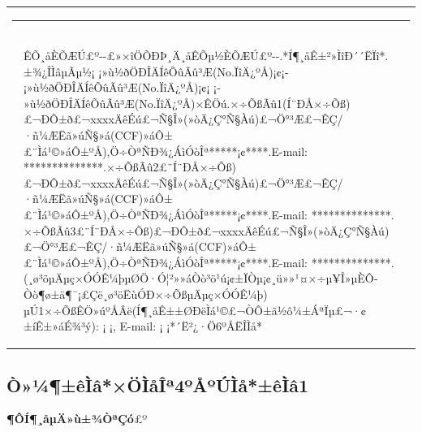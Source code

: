 \documentclass[10.5pt,compsoc]{CjC}
\theoremstyle{mystyle}
\begin{document}
\begin{table}[!t]
\setlength{\tabcolsep}{2pt}
\begin{tabular}{p{0.05cm}p{16.15cm}}
\multicolumn{2}{l}{\rule[4mm]{40mm}{0.1mm}}\\[-3mm]
&\begin{CJK*}{GBK}{gbsn}
ÊÕ¸åÈÕÆÚ£º\quad \quad -\quad -\quad £»×îÖÕÐÞ¸Ä¸åÊÕµ½ÈÕÆÚ£º\quad \quad -\quad -\quad .*Í¶¸åÊ±²»ÌîÐ´´ËÏî*. ±¾¿ÎÌâµÃµ½¡­ ¡­»ù½ðÖÐÎÄÍêÕûÃû³Æ(No.ÏîÄ¿ºÅ)¡¢¡­ ¡­»ù½ðÖÐÎÄÍêÕûÃû³Æ(No.ÏîÄ¿ºÅ)¡¢¡­ ¡­ »ù½ðÖÐÎÄÍêÕûÃû³Æ(No.ÏîÄ¿ºÅ)×ÊÖú.×÷ÕßÃû1(Í¨ÐÅ×÷Õß)£¬ÐÔ±ð£¬xxxxÄêÉú£¬Ñ§Î»(»òÄ¿Ç°Ñ§Àú)£¬Ö°³Æ£¬ÊÇ/·ñ¼ÆËã»úÑ§»á(CCF)»áÔ±£¨Ìá¹©»áÔ±ºÅ),Ö÷ÒªÑÐ¾¿ÁìÓòÎª*****¡¢****.E-mail: **************.×÷ÕßÃû2£¨Í¨ÐÅ×÷Õß)£¬ÐÔ±ð£¬xxxxÄêÉú£¬Ñ§Î»(»òÄ¿Ç°Ñ§Àú)£¬Ö°³Æ£¬ÊÇ/·ñ¼ÆËã»úÑ§»á(CCF)»áÔ±£¨Ìá¹©»áÔ±ºÅ),Ö÷ÒªÑÐ¾¿ÁìÓòÎª*****¡¢****.E-mail: **************. ×÷ÕßÃû3£¨Í¨ÐÅ×÷Õß)£¬ÐÔ±ð£¬xxxxÄêÉú£¬Ñ§Î»(»òÄ¿Ç°Ñ§Àú)£¬Ö°³Æ£¬ÊÇ/·ñ¼ÆËã»úÑ§»á(CCF)»áÔ±£¨Ìá¹©»áÔ±ºÅ),Ö÷ÒªÑÐ¾¿ÁìÓòÎª*****¡¢****.E-mail: **************.(¸ø³öµÄµç×ÓÓÊ¼þµØÖ·Ó¦²»»áÒò³ö¹ú¡¢±ÏÒµ¡¢¸ü»»¹¤×÷µ¥Î»µÈÔ­Òò¶ø±ä¶¯¡£Çë¸ø³öËùÓÐ×÷ÕßµÄµç×ÓÓÊ¼þ)
µÚ1×÷ÕßÊÖ»úºÅÂë(Í¶¸åÊ±±ØÐëÌá¹©£¬ÒÔ±ã½ô¼±ÁªÏµ£¬·¢±íÊ±»áÉ¾³ý): ¡­ ¡­, E-mail: ¡­ ¡­*´Ë²¿·Ö6ºÅËÎÌå*
\end{CJK*}
\end{tabular}\end{table}
\clearpage\clearpage
\begin{strip}
\vspace {-13mm}
\end{strip}
    \linespread{1.15}
\begin{CJK*}{GBK}{hei}
\vskip 1mm
\section{Ò»¼¶±êÌâ*×ÖÌåÎª4ºÅºÚÌå*±êÌâ1}
\textbf{¶ÔÍ¶¸åµÄ»ù±¾ÒªÇó}£º
\end{CJK*}
\end{document}
